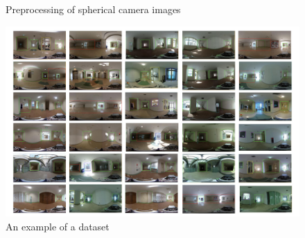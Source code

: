 \documentclass[../main]{subfiles}
\begin{document}
        \begin{figure}[htbp]
          \centering
           \caption{Preprocessing of spherical camera images}
           \label{figure::proc_exp}
        \end{figure}
        
        \begin{figure}[H]
         \centering
         \includegraphics[width=16cm]{../images/dataset_exp.png}
         \caption{An example of a dataset}
         \label{figure::dataset_fig}
        \end{figure}
\end{document}
